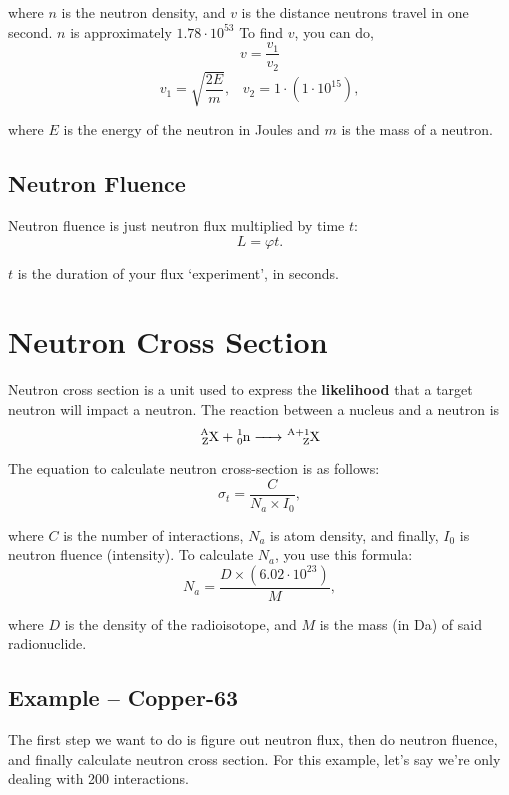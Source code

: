 \documentclass{article}
\begin{document}
\begin{multicols*}{2}
    where $n$ is the neutron density, and $v$ is the distance neutrons travel
    in one second. $n$ is approximately $1.78\cdot 10^{53}$ To find $v$, you can do,
      \[
        v = \frac{v_1}{v_2}
      \]\[
        v_1 = \sqrt{\frac{2E}{m}},\;\;\;
        v_2 = 1 \cdot \left(1 \cdot 10^{15}\right),
      \]

      where $E$ is the energy of the neutron in Joules and $m$ is the mass of a neutron.

    \subsection{Neutron Fluence}
    Neutron fluence is just neutron flux multiplied by time $t$:
    \[
      L = \varphi{t}.
    \]

    $t$ is the duration of your flux `experiment', in seconds.

    \section{Neutron Cross Section}
    Neutron cross section is a unit used to express the \textbf{likelihood} that
    a target neutron will impact a neutron. The reaction between a nucleus and a
    neutron is
    \[
      \ce{^{A}_{Z}X + ^{1}_{0}n -> ^{A+1}_{Z}X}
    \]

    The equation to calculate neutron cross-section is as follows:
    \[
      \sigma_t = \frac{C}{N_a \times I_0},
    \]

    where $C$ is the number of interactions, $N_a$ is atom density, and finally,
    $I_0$ is neutron fluence (intensity). To calculate $N_a$, you use this formula:
    \[
      N_a = \frac{D\times(6.02\cdot10^{23})}{M},
    \]

    where $D$ is the density of the radioisotope, and $M$ is the mass (in Da) of
    said radionuclide.

    \subsection{Example -- Copper-63}
    The first step we want to do is figure out neutron flux, then do neutron fluence,
    and finally calculate neutron cross section. For this example, let's say we're only
    dealing with 200 interactions.


\end{multicols*}
\end{document}
